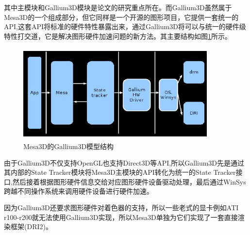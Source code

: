 其中主模块和Gallium3D模块是论文的研究重点所在。而Gallium3D虽然属于Mesa3D的一个组成部分，但它同样是一个开源的图形项目，它提供一套统一的API,这套API将标准的硬件特性暴露出来，通过Gallium3D将可以与统一的硬件级特性打交道，它是解决图形硬件加速问题的新方法。其主要结构如图\ref{fig:Gallium3D}所示。

\begin{figure}[H] 
  \centering
  \includegraphics[width=10cm,height=5cm]{figures/chap02/Gallium3D}
  \caption{Mesa3D的Gallium3D模型结构}
  \label{fig:Gallium3D}
\end{figure}

由于Gallium3D不仅支持OpenGL也支持Direct3D等API,所以Gallium3D先是通过其内部的State Tracker模块将Mesa3D主模块的API转化为统一的State Tracker接口,然后接着根据图形硬件信息交给对应图形硬件设备驱动处理，最后通过WinSys跨越不同操作系统来调用硬件设备进行硬件加速\cite{Gallium3D}。

因为Gallium3D还要求图形硬件对着色器的支持，所以一些老式的显卡例如ATI r100-r200就无法使用Gallium3D实现，所以Mesa3D单独为它们实现了一套直接渲染框架(DRI2)。


